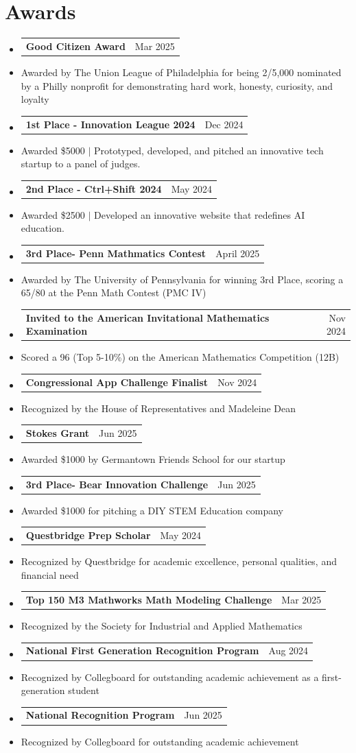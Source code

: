 \documentclass[letterpaper,11pt]{article}
\makeatletter
\newcommand{\resumeItem}[1]{
  \item\small{
    {#1 \vspace{-2pt}}
  }
}
\newcommand{\resumeProjectHeading}[2]{
    \item
    \begin{tabular*}{0.97\textwidth}{l@{\extracolsep{\fill}}r}
      \normalsize#1 & #2 \\
    \end{tabular*}\vspace{-7pt}
}
\newcommand{\resumeSubHeadingListStart}{\begin{itemize}[leftmargin=0.15in, label={}]}
\newcommand{\resumeSubHeadingListEnd}{\end{itemize}}
\makeatother
\begin{document}
\section{Awards}
    \resumeSubHeadingListStart
      \resumeProjectHeading
          {\textbf{Good Citizen Award}}{Mar 2025}
          \resumeItem{Awarded by The Union League of Philadelphia for being 2/5,000 nominated by a Philly nonprofit for demonstrating hard work, honesty, curiosity, and loyalty}
      \resumeProjectHeading
          {\textbf{1st Place - Innovation League 2024}}{Dec 2024}
            \resumeItem{Awarded \$5000 $|$ Prototyped, developed, and pitched an innovative tech startup to a panel of judges.}
      \resumeProjectHeading
          {\textbf{2nd Place - Ctrl+Shift 2024}}{May 2024}
            \resumeItem{Awarded \$2500 $|$ Developed an innovative website that redefines AI education.} 
      \resumeProjectHeading
          {\textbf{3rd Place- Penn Mathmatics Contest}}{April 2025}
          \resumeItem{Awarded by The University of Pennsylvania for winning 3rd Place, scoring a 65/80 at the Penn Math Contest (PMC IV)}
      \resumeProjectHeading
          {\textbf{Invited to the American Invitational Mathematics Examination}}{Nov 2024}
            \resumeItem{Scored a 96 (Top 5-10\%) on the American Mathematics Competition (12B)}
      \resumeProjectHeading
          {\textbf{Congressional App Challenge Finalist}}{Nov 2024}
          \resumeItem{Recognized by the House of Representatives and Madeleine Dean}
      \resumeProjectHeading
          {\textbf{Stokes Grant}}{Jun 2025}
          \resumeItem{Awarded \$1000 by Germantown Friends School for our startup}
      \resumeProjectHeading
          {\textbf{3rd Place- Bear Innovation Challenge}}{Jun 2025}
          \resumeItem{Awarded \$1000 for pitching a DIY STEM Education company}
      \resumeProjectHeading
          {\textbf{Questbridge Prep Scholar}}{May 2024}
          \resumeItem{Recognized by Questbridge for academic excellence, personal qualities, and financial need}
      \resumeProjectHeading
          {\textbf{Top 150 M3 Mathworks Math Modeling Challenge}}{Mar 2025}
          \resumeItem{Recognized by the Society for Industrial and Applied Mathematics}
      \resumeProjectHeading
          {\textbf{National First Generation Recognition Program}}{Aug 2024}
          \resumeItem{Recognized by Collegboard for outstanding academic achievement as a first-generation student}
      \resumeProjectHeading
          {\textbf{National Recognition Program}}{Jun 2025}
          \resumeItem{Recognized by Collegboard for outstanding academic achievement}
    \resumeSubHeadingListEnd
\end{document}
